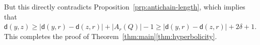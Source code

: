 \documentclass[a4paper]{article}
\newcommand{\dist}[2]{\mathsf{d}\left(#1,#2\right)}
\newcommand{\anticp}[2]{A_{#1}\left(#2\right)}
\newcommand{\slim}[1]{sl\left(#1\right)}
\newcommand{\ipac}[1]{ipacc\left(#1\right)}
\newtheorem{lemma}[theorem]{Lemma}
\newcommand{\dd}[1]{\textcolor{red}{#1}}
\begin{document}
 
But this directly contradicts Proposition~\ref{prp:antichain-length}, which implies that $\dist{y}{z} \geq \left|\dist{y}{r} - \dist{z}{r}\right| + \left|\anticp{r}{Q}\right| - 1 \geq \left|\dist{y}{r} - \dist{z}{r}\right| + 2\delta + 1 $. This completes the proof of Theorem~\ref{thm:main}\ref{thm:hyperbolicity}.






\end{document}
